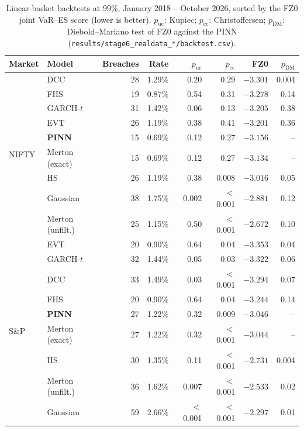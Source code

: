 \begin{table}[t]
  \centering
  \caption{Linear-basket backtests at 99\%, January 2018 -- October 2026, sorted by the FZ0 joint
    VaR--ES score (lower is better). $p_{\mathrm{uc}}$: Kupiec; $p_{\mathrm{cc}}$: Christoffersen;
    $p_{\mathrm{DM}}$: Diebold--Mariano test of FZ0 against the PINN
    (\texttt{results/stage6\_realdata\_*/backtest.csv}).}
  \label{tab:backtest}
  \small
  \begin{tabular}{llrrrrrr}
    \toprule
    Market & Model & Breaches & Rate & $p_{\mathrm{uc}}$ & $p_{\mathrm{cc}}$ & FZ0 & $p_{\mathrm{DM}}$ \\
    \midrule
    \multirow{9}{*}{NIFTY}
      & DCC             & 28 & 1.29\% & 0.20 & 0.29 & $-3.301$ & 0.004 \\
      & FHS             & 19 & 0.87\% & 0.54 & 0.31 & $-3.278$ & 0.14 \\
      & GARCH-$t$       & 31 & 1.42\% & 0.06 & 0.13 & $-3.205$ & 0.38 \\
      & EVT             & 26 & 1.19\% & 0.38 & 0.41 & $-3.201$ & 0.36 \\
      & \textbf{PINN}   & 15 & 0.69\% & 0.12 & 0.27 & $-3.156$ & -- \\
      & Merton (exact)  & 15 & 0.69\% & 0.12 & 0.27 & $-3.134$ & -- \\
      & HS              & 26 & 1.19\% & 0.38 & 0.008 & $-3.016$ & 0.05 \\
      & Gaussian        & 38 & 1.75\% & 0.002 & $<$0.001 & $-2.881$ & 0.12 \\
      & Merton (unfilt.) & 25 & 1.15\% & 0.50 & $<$0.001 & $-2.672$ & 0.10 \\
    \midrule
    \multirow{9}{*}{S\&P}
      & EVT             & 20 & 0.90\% & 0.64 & 0.04 & $-3.353$ & 0.04 \\
      & GARCH-$t$       & 32 & 1.44\% & 0.05 & 0.03 & $-3.322$ & 0.06 \\
      & DCC             & 33 & 1.49\% & 0.03 & $<$0.001 & $-3.294$ & 0.07 \\
      & FHS             & 20 & 0.90\% & 0.64 & 0.04 & $-3.244$ & 0.14 \\
      & \textbf{PINN}   & 27 & 1.22\% & 0.32 & 0.009 & $-3.046$ & -- \\
      & Merton (exact)  & 27 & 1.22\% & 0.32 & $<$0.001 & $-3.044$ & -- \\
      & HS              & 30 & 1.35\% & 0.11 & $<$0.001 & $-2.731$ & 0.004 \\
      & Merton (unfilt.) & 36 & 1.62\% & 0.007 & $<$0.001 & $-2.533$ & 0.02 \\
      & Gaussian        & 59 & 2.66\% & $<$0.001 & $<$0.001 & $-2.297$ & 0.01 \\
    \bottomrule
  \end{tabular}
\end{table}

